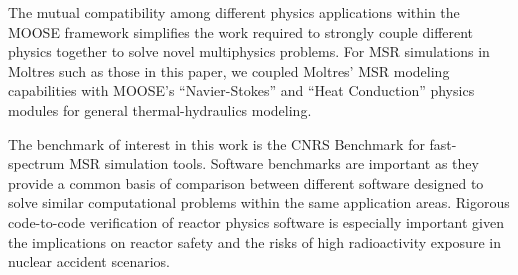 The mutual compatibility among different physics applications within the
\gls{MOOSE} framework simplifies the work required to strongly couple
different physics together to solve novel multiphysics problems. For \gls{MSR}
simulations in Moltres such as those in this paper, we coupled Moltres'
\gls{MSR} modeling capabilities with \gls{MOOSE}'s ``Navier-Stokes'' and
``Heat Conduction'' physics modules \citep{peterson_overview_2018} for
general thermal-hydraulics modeling.

The benchmark of interest in this work is the CNRS Benchmark
\citep{tiberga_results_2020} for fast-spectrum \gls{MSR} simulation tools.
Software benchmarks are important as
they provide a common basis of comparison between different software designed
to solve similar computational problems within the same application areas.
Rigorous code-to-code verification of reactor physics software is especially
important given the implications on reactor safety and the risks of high
radioactivity exposure in nuclear accident scenarios.

